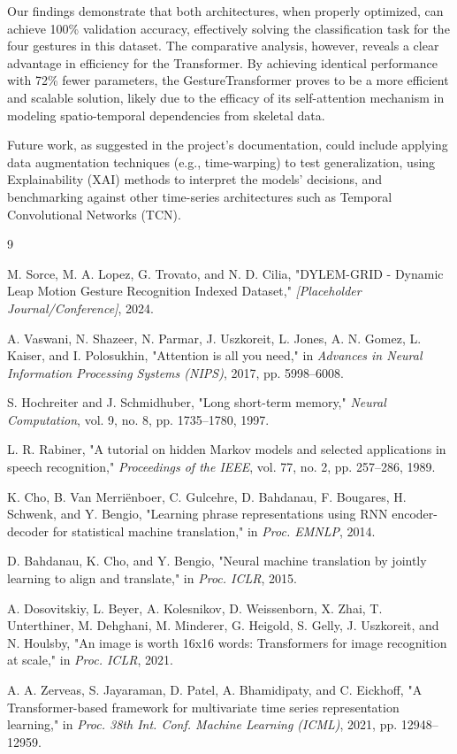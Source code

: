 \documentclass[]{IEEEphot}
\begin{document}
Our findings demonstrate that both architectures, when properly optimized, can achieve 100\% validation accuracy, effectively solving the classification task for the four gestures in this dataset. The comparative analysis, however, reveals a clear advantage in efficiency for the Transformer. By achieving identical performance with 72\% fewer parameters, the GestureTransformer proves to be a more efficient and scalable solution, likely due to the efficacy of its self-attention mechanism in modeling spatio-temporal dependencies from skeletal data.

Future work, as suggested in the project's documentation, could include applying data augmentation techniques (e.g., time-warping) to test generalization, using Explainability (XAI) methods to interpret the models' decisions, and benchmarking against other time-series architectures such as Temporal Convolutional Networks (TCN).

\begin{thebibliography}{9}

M. Sorce, M. A. Lopez, G. Trovato, and N. D. Cilia, "DYLEM-GRID - Dynamic Leap Motion Gesture Recognition Indexed Dataset," \emph{[Placeholder Journal/Conference]}, 2024.

A. Vaswani, N. Shazeer, N. Parmar, J. Uszkoreit, L. Jones, A. N. Gomez, L. Kaiser, and I. Polosukhin, "Attention is all you need," in \emph{Advances in Neural Information Processing Systems (NIPS)}, 2017, pp. 5998--6008.

S. Hochreiter and J. Schmidhuber, "Long short-term memory," \emph{Neural Computation}, vol. 9, no. 8, pp. 1735--1780, 1997.

L. R. Rabiner, "A tutorial on hidden Markov models and selected applications in speech recognition," \emph{Proceedings of the IEEE}, vol. 77, no. 2, pp. 257--286, 1989.

K. Cho, B. Van Merriënboer, C. Gulcehre, D. Bahdanau, F. Bougares, H. Schwenk, and Y. Bengio, "Learning phrase representations using RNN encoder-decoder for statistical machine translation," in \emph{Proc. EMNLP}, 2014.

D. Bahdanau, K. Cho, and Y. Bengio, "Neural machine translation by jointly learning to align and translate," in \emph{Proc. ICLR}, 2015.

A. Dosovitskiy, L. Beyer, A. Kolesnikov, D. Weissenborn, X. Zhai, T. Unterthiner, M. Dehghani, M. Minderer, G. Heigold, S. Gelly, J. Uszkoreit, and N. Houlsby, "An image is worth 16x16 words: Transformers for image recognition at scale," in \emph{Proc. ICLR}, 2021.

A. A. Zerveas, S. Jayaraman, D. Patel, A. Bhamidipaty, and C. Eickhoff, "A Transformer-based framework for multivariate time series representation learning," in \emph{Proc. 38th Int. Conf. Machine Learning (ICML)}, 2021, pp. 12948--12959.

\end{thebibliography}
\end{document}
